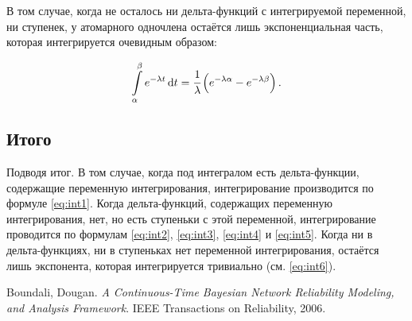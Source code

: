 \documentclass[a4paper, 12pt]{article}
\begin{document}
В том случае, когда не осталось ни дельта-функций с интегрируемой переменной, ни ступенек, у атомарного одночлена остаётся лишь экспоненциальная часть, которая интегрируется очевидным образом:

\begin{equation}
  \label{eq:int6}
  \int\limits_{\alpha}^{\beta} e^{-\lambda t} \dif t = \cfrac{1}{\lambda}\left(e^{-\lambda \alpha} - e^{-\lambda \beta}\right).
\end{equation}

\subsection{Итого}

Подводя итог. В том случае, когда под интегралом есть дельта-функции, содержащие переменную интегрирования, интегрирование производится по формуле \ref{eq:int1}. Когда дельта-функций, содержащих переменную интегрирования, нет, но есть ступеньки с этой переменной, интегрирование проводится по формулам \ref{eq:int2}, \ref{eq:int3}, \ref{eq:int4} и \ref{eq:int5}. Когда ни в дельта-функциях, ни в ступеньках нет переменной интегрирования, остаётся лишь экспонента, которая интегрируется тривиально (см. \ref{eq:int6}).

\begin{thebibliography}{9}

  Boundali, Dougan.
  \emph{A Continuous-Time Bayesian Network Reliability Modeling, and Analysis Framework}.
  IEEE Transactions on Reliability,
  2006.

\end{thebibliography}
\end{document}
